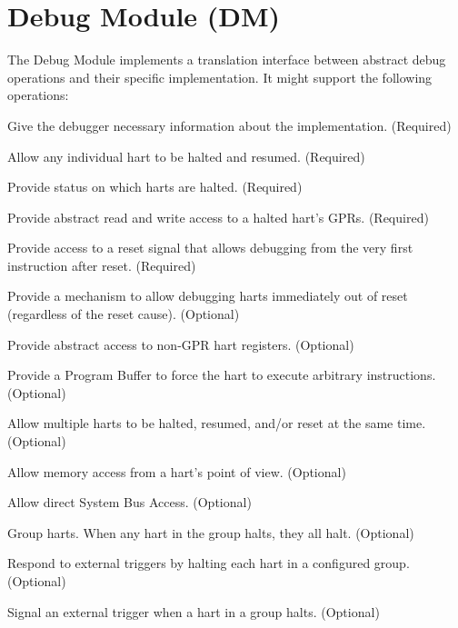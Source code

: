 \chapter{Debug Module (DM)} \label{dm}

\begin{steps}{The Debug Module implements a translation interface between abstract debug
    operations and their specific implementation. It might support the following
    operations:}
\item Give the debugger necessary information about the implementation. (Required)
\item Allow any individual hart to be halted and resumed. (Required)
\item Provide status on which harts are halted. (Required)
\item Provide abstract read and write access to a halted hart's GPRs. (Required)
\item Provide access to a reset signal that allows debugging from the very
    first instruction after reset. (Required)
\item Provide a mechanism to allow debugging harts immediately out of reset
      (regardless of the reset cause). (Optional)
\item Provide abstract access to non-GPR hart registers. (Optional)
\item Provide a Program Buffer to force the hart to execute arbitrary instructions. (Optional)
\item Allow multiple harts to be halted, resumed, and/or reset at the same time. (Optional)
\item Allow memory access from a hart's point of view. (Optional)
\item Allow direct System Bus Access. (Optional)
\item Group harts. When any hart in the group halts, they all halt. (Optional)
\item Respond to external triggers by halting each hart in a configured group. (Optional)
\item Signal an external trigger when a hart in a group halts. (Optional)
\end{steps}

